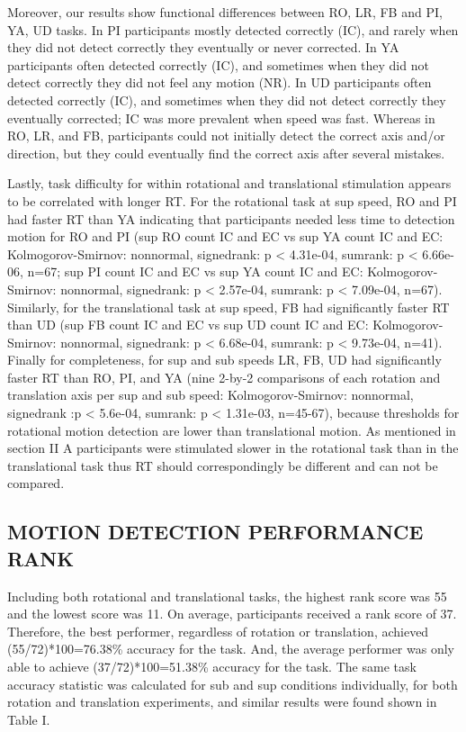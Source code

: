 \documentclass[11pt, onecolumn]{article}
\begin{document}
Moreover, our results show functional differences between RO, LR, FB and PI, YA, UD tasks.  In PI participants mostly detected correctly (IC), and rarely when they did not detect correctly they eventually or never corrected.  In YA participants often detected correctly (IC), and sometimes when they did not detect correctly they did not feel any motion (NR).  In UD participants often detected correctly (IC),  and sometimes when they did not detect correctly they eventually corrected; IC was more prevalent when speed was fast.  Whereas in RO, LR, and FB, participants could not initially detect the correct axis and/or direction, but they could eventually find the correct axis after several mistakes.

Lastly, task difficulty for within rotational and translational stimulation appears to be correlated with longer RT.  For the rotational task at sup speed, RO and PI had faster RT than YA indicating that participants needed less time to detection motion for RO and PI (sup RO count IC and EC vs sup YA count IC and EC: Kolmogorov-Smirnov: nonnormal, signedrank: p < 4.31e-04, sumrank: p < 6.66e-06, n=67; sup PI count IC and EC vs sup YA count IC and EC: Kolmogorov-Smirnov: nonnormal, signedrank: p < 2.57e-04, sumrank: p < 7.09e-04, n=67).  Similarly, for the translational task at sup speed, FB had significantly faster RT than UD (sup FB count IC and EC vs sup UD count IC and EC: Kolmogorov-Smirnov: nonnormal, signedrank: p < 6.68e-04, sumrank: p < 9.73e-04, n=41).  Finally for completeness, for sup and sub speeds LR, FB, UD had significantly faster RT than RO, PI, and YA (nine 2-by-2 comparisons of each rotation and translation axis per sup and sub speed: Kolmogorov-Smirnov: nonnormal, signedrank :p < 5.6e-04, sumrank: p < 1.31e-03, n=45-67), because thresholds for rotational motion detection are lower than translational motion.  As mentioned in section II A participants were stimulated slower in the rotational task than in the translational task thus RT should correspondingly be different and can not be compared.

\subsection{MOTION DETECTION PERFORMANCE RANK}
Including both rotational and translational tasks, the highest rank score was 55 and the lowest score was 11.  On average, participants received a rank score of 37.  Therefore, the best performer, regardless of rotation or translation, achieved (55/72)*100=76.38\% accuracy for the task.  And, the average performer was only able to achieve (37/72)*100=51.38\% accuracy for the task.  The same task accuracy statistic was calculated for sub and sup conditions individually, for both rotation and translation experiments, and similar results were found shown in Table I. 
\end{document}
